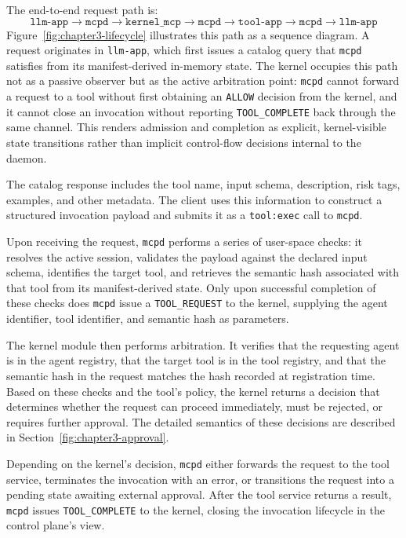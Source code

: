 The end-to-end request path is:
\[
\texttt{llm-app} \to \texttt{mcpd} \to \texttt{kernel\_mcp} \to
\texttt{mcpd} \to \texttt{tool-app} \to \texttt{mcpd} \to \texttt{llm-app}
\]
Figure~\ref{fig:chapter3-lifecycle} illustrates this path as a sequence diagram.
A request originates in \texttt{llm-app}, which first issues a catalog query that \texttt{mcpd} satisfies from its manifest-derived in-memory state.
The kernel occupies this path not as a passive observer but as the active arbitration point: \texttt{mcpd} cannot forward a request to a tool without first obtaining an \texttt{ALLOW} decision from the kernel, and it cannot
close an invocation without reporting \texttt{TOOL\_COMPLETE} back through the same channel.
This renders admission and completion as explicit, kernel-visible state transitions rather than implicit control-flow decisions internal to the daemon.

The catalog response includes the tool name, input schema, description, risk tags, examples, and other metadata.
The client uses this information to construct a structured invocation payload and submits it as a \texttt{tool:exec} call to \texttt{mcpd}.

Upon receiving the request, \texttt{mcpd} performs a series of user-space checks: it resolves the active session, validates the payload against the declared input schema, identifies the target tool, and retrieves the semantic hash associated with that tool from its manifest-derived state.
Only upon successful completion of these checks does \texttt{mcpd} issue a
\texttt{TOOL\_REQUEST} to the kernel, supplying the agent identifier, tool identifier, and semantic hash as parameters.

The kernel module then performs arbitration.
It verifies that the requesting agent is in the agent registry, that the target tool is in the tool registry, and that the semantic hash in the request matches the hash recorded at registration time.
Based on these checks and the tool’s policy, the kernel returns a decision that determines whether the request can proceed immediately, must be rejected, or requires further approval.
The detailed semantics of these decisions are described in Section~\ref{fig:chapter3-approval}.

Depending on the kernel’s decision, \texttt{mcpd} either forwards the request to the tool service, terminates the invocation with an error, or transitions the request into a pending state awaiting external approval.
After the tool service returns a result, \texttt{mcpd} issues \texttt{TOOL\_COMPLETE} to the kernel, closing the invocation lifecycle in the control plane’s view.

